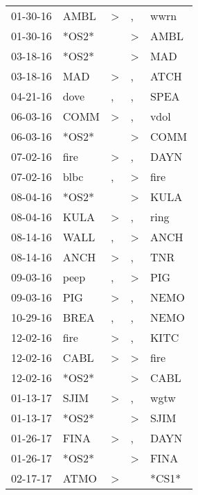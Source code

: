 \begin{supertabular}{lllll}
 01-30-16 &   AMBL &     \textgreater &                , &   wwrn \\
 01-30-16 &  *OS2* &                  &     \textgreater &   AMBL \\
 03-18-16 &  *OS2* &                  &     \textgreater &    MAD \\
 03-18-16 &    MAD &     \textgreater &                , &   ATCH \\
 04-21-16 &   dove &                , &                , &   SPEA \\
 06-03-16 &   COMM &     \textgreater &                , &   vdol \\
 06-03-16 &  *OS2* &                  &     \textgreater &   COMM \\
 07-02-16 &   fire &     \textgreater &                , &   DAYN \\
 07-02-16 &   blbc &                , &     \textgreater &   fire \\
 08-04-16 &  *OS2* &                  &     \textgreater &   KULA \\
 08-04-16 &   KULA &     \textgreater &                , &   ring \\
 08-14-16 &   WALL &                , &     \textgreater &   ANCH \\
 08-14-16 &   ANCH &     \textgreater &                , &    TNR \\
 09-03-16 &   peep &                , &     \textgreater &    PIG \\
 09-03-16 &    PIG &     \textgreater &                , &   NEMO \\
 10-29-16 &   BREA &                , &                , &   NEMO \\
 12-02-16 &   fire &     \textgreater &                , &   KITC \\
 12-02-16 &   CABL &     \textgreater &     \textgreater &   fire \\
 12-02-16 &  *OS2* &                  &     \textgreater &   CABL \\
 01-13-17 &   SJIM &     \textgreater &                , &   wgtw \\
 01-13-17 &  *OS2* &                  &     \textgreater &   SJIM \\
 01-26-17 &   FINA &     \textgreater &                , &   DAYN \\
 01-26-17 &  *OS2* &                  &     \textgreater &   FINA \\
 02-17-17 &   ATMO &     \textgreater &                  &  *CS1* \\

\end{supertabular}
